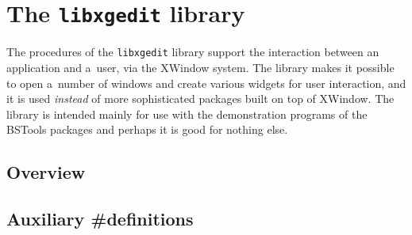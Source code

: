 

\chapter{The \texttt{libxgedit} library}

The procedures of the \texttt{libxgedit} library support the interaction
between an application and a~user, via the XWindow system. The library
makes it possible to open a~number of windows and create various widgets
for user interaction, and it is used \emph{instead} of more sophisticated
packages built on top of XWindow. The library is intended mainly for use
with the demonstration programs of the BSTools packages and perhaps
it is good for nothing else.

\section{Overview}

\section{Auxiliary \#definitions}


